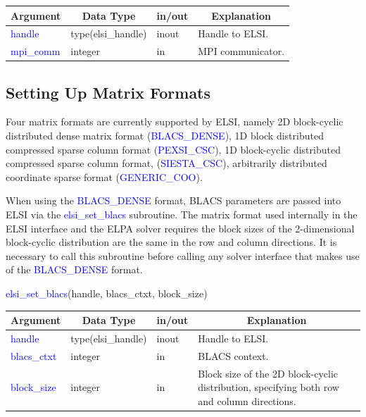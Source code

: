 \documentclass{report}
\begin{document}
\begin{tabular}[]{|p{30mm}|p{30mm}|p{15mm}|p{90mm}|}
\hline
\multicolumn{1}{|c|}{\textbf{Argument}} & \multicolumn{1}{c|}{\textbf{Data Type}} & \multicolumn{1}{c|}{\textbf{in/out}} & \multicolumn{1}{c|}{\textbf{Explanation}}\\
\hline
\textcolor{blue}{handle}    & type(elsi\_handle) & inout & Handle to ELSI.\\
\hline
\textcolor{blue}{mpi\_comm} & integer            & in    & MPI communicator.\\
\hline
\end{tabular}

\subsection{Setting Up Matrix Formats}
\label{subsec:setup_matrix}
Four matrix formats are currently supported by ELSI, namely 2D block-cyclic distributed dense matrix format (\textcolor{blue}{BLACS\_DENSE}), 1D block distributed compressed sparse column format (\textcolor{blue}{PEXSI\_CSC}), 1D block-cyclic distributed compressed sparse column format, (\textcolor{blue}{SIESTA\_CSC}), arbitrarily distributed coordinate sparse format (\textcolor{blue}{GENERIC\_COO}).

When using the \textcolor{blue}{BLACS\_DENSE} format, BLACS parameters are passed into ELSI via the \textcolor{blue}{elsi\_set\_blacs} subroutine.  The matrix format used internally in the ELSI interface and the ELPA solver requires the block sizes of the 2-dimensional block-cyclic distribution are the same in the row and column directions.  It is necessary to call this subroutine before calling any solver interface that makes use of the \textcolor{blue}{BLACS\_DENSE} format.
\begin{labeling}{\hspace{6cm}}
\item [\hspace{0.3cm} \textcolor{blue}{elsi\_set\_blacs}(handle, blacs\_ctxt, block\_size)]
\end{labeling}

\begin{tabular}[]{|p{30mm}|p{30mm}|p{15mm}|p{90mm}|}
\hline
\multicolumn{1}{|c|}{\textbf{Argument}} & \multicolumn{1}{c|}{\textbf{Data Type}} & \multicolumn{1}{c|}{\textbf{in/out}} & \multicolumn{1}{c|}{\textbf{Explanation}}\\
\hline
\textcolor{blue}{handle}      & type(elsi\_handle) & inout & Handle to ELSI.\\
\hline
\textcolor{blue}{blacs\_ctxt} & integer            & in    & BLACS context.\\
\hline
\textcolor{blue}{block\_size} & integer            & in    & Block size of the 2D block-cyclic distribution, specifying both row and column directions.\\
\hline
\end{tabular}
\end{document}
